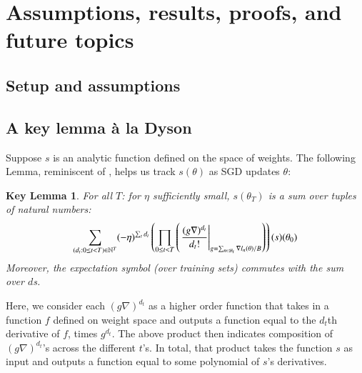 \documentclass{article}
\theoremstyle{plain}
\newtheorem*{klem*}{Key Lemma}
\theoremstyle{definition}
\newcommand{\wrap}[1]{\left(#1\right)}
\newcommand{\Bb}{\mathcal{B}}
\begin{document}

\section{Assumptions, results, proofs, and future topics}\label{appendix:math}
    \subsection{Setup and assumptions}                              \label{appendix:assumptions}

    \subsection{A key lemma \`a la Dyson}                           \label{appendix:key-lemma}

        Suppose $s$ is an analytic function defined on the space of weights.
        The following Lemma, reminiscent of \cite{dy49a}, helps us track
        $s(\theta)$ as SGD updates $\theta$:
        \begin{klem*} \label{lem:dyson}
            For all $T$: for $\eta$ sufficiently small, $s(\theta_T)$ is a sum
            over tuples of natural numbers:
            \begin{equation}\label{eq:dyson}
                \sum_{(d_t: 0\leq t<T) \in \NN^T}
                (-\eta)^{\sum_t d_t}
                \wrap{
                    \prod_{0 \leq t < T}
                        \wrap{\left.
                            \frac{(g \nabla)^{d_t}}{d_t!}
                        \right|_{g = \sum_{n\in \Bb_t} \nabla l_n(\theta) / B}}
                }(s) (\theta_0)
            \end{equation}
            Moreover, the expectation symbol (over training sets) commutes with
            the sum over $d$s.
        \end{klem*}
        Here, we consider each $(g \nabla)^{d_t}$ as a higher order function
        that takes in a function $f$ defined on weight space and outputs a
        function equal to the $d_t$th derivative of $f$, times $g^{d_t}$.
        The above product then indicates composition of $(g \nabla)^{d_t}$'s
        across the different $t$'s.  In total, that product takes the function
        $s$ as input and outputs a function equal to some polynomial of $s$'s
        derivatives.
\end{document}
